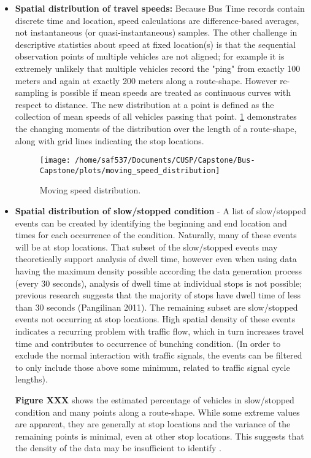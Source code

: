 \documentclass[12pt]{report}
\begin{document}
\begin{itemize}
\item \textbf{Spatial distribution of travel speeds:} Because Bus Time records contain discrete time and location, speed calculations are difference-based averages, not instantaneous (or quasi-instantaneous) samples.  The other challenge in descriptive statistics about speed at fixed location(s) is that the sequential observation points of multiple vehicles are not aligned; for example it is extremely unlikely that multiple vehicles record the "ping" from exactly 100 meters and again at exactly 200 meters along a route-shape.  However re-sampling is possible if mean speeds are treated as continuous curves with respect to distance.  The new distribution at a point is defined as the collection of mean speeds of all vehicles passing that point.  \ref{msd} demonstrates the changing moments of the distribution over the length of a route-shape, along with grid lines indicating the stop locations.


\begin{figure}[!ht]
  \caption{Moving speed distribution.}
  \label{msd}
  \centering
    \texttt{[image: /home/saf537/Documents/CUSP/Capstone/Bus-Capstone/plots/moving\_speed\_distribution]}
\end{figure}

\item \textbf{Spatial distribution of slow/stopped condition} - A list of slow/stopped events can be created by identifying the beginning and end location and times for each occurrence of the condition.  Naturally, many of these events will be at stop locations.   That subset of the slow/stopped events may theoretically support analysis of dwell time, however even when using data having the maximum density possible according the data generation process (every 30 seconds), analysis of dwell time at individual stops is not possible; previous research suggests that the majority of stops have dwell time of less than 30 seconds (Pangilinan 2011).  The remaining subset are slow/stopped events not occurring at stop locations.  High spatial density of these events indicates a recurring problem with traffic flow, which in turn increases travel time and contributes to occurrence of bunching condition.  (In order to exclude the normal interaction with traffic signals, the events can be filtered to only include those above some minimum, related to traffic signal cycle lengths).

\textbf{Figure XXX} shows the estimated percentage of vehicles in slow/stopped condition and many points along a route-shape.  While some extreme values are apparent, they are generally at stop locations and the variance of the remaining points is minimal, even at other stop locations.  This suggests that the density of the data may be insufficient to identify .




\end{itemize}
\end{document}

